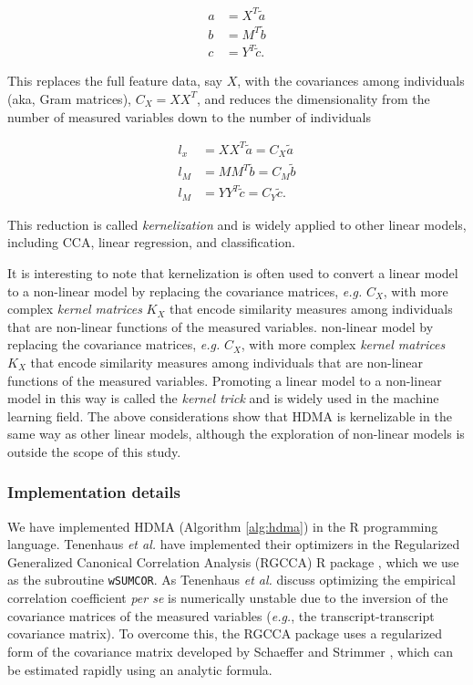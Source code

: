 \documentclass[
]{article}
\begin{document}
\begin{align}
a &= X^T \tilde{a} \\
b &= M^T \tilde{b} \\
c &= Y^T \tilde{c}.
\end{align}

This replaces the full feature data, say \(X\), with the covariances
among individuals (aka, Gram matrices), \(C_X = XX^T\), and reduces the
dimensionality from the number of measured variables down to the number
of individuals

\begin{align}
l_x &= XX^T \tilde{a} = C_X \tilde{a} \\
l_M &= MM^T \tilde{b} = C_M \tilde{b} \\
l_M &= YY^T \tilde{c} = C_Y \tilde{c}.
\end{align}

This reduction is called \textit{kernelization}
\cite{tenenhaus2015kernel} and is widely applied to other linear models,
including CCA, linear regression, and classification.

It is interesting to note that kernelization is often used to convert a
linear model to a non-linear model by replacing the covariance matrices,
\textit{e.g.} \(C_X\), with more complex \textit{kernel matrices}
\(K_X\) that encode similarity measures among individuals that are
non-linear functions of the measured variables. non-linear model by
replacing the covariance matrices, \textit{e.g.} \(C_X\), with more
complex \textit{kernel matrices} \(K_X\) that encode similarity measures
among individuals that are non-linear functions of the measured
variables. Promoting a linear model to a non-linear model in this way is
called the \textit{kernel trick} and is widely used in the machine
learning field. The above considerations show that HDMA is kernelizable
in the same way as other linear models, although the exploration of
non-linear models is outside the scope of this study.

\subsubsection{Implementation details}\label{implementation-details}

We have implemented HDMA (Algorithm \ref{alg:hdma}) in the R programming
language. Tenenhaus \textit{et al.} have implemented their optimizers in
the Regularized Generalized Canonical Correlation Analysis (RGCCA) R
package \cite{girka2023multiblock}, which we use as the subroutine
\texttt{wSUMCOR}. As Tenenhaus \textit{et al.} discuss optimizing the
empirical correlation coefficient \textit{per se} is numerically
unstable due to the inversion of the covariance matrices of the measured
variables (\textit{e.g.}, the transcript-transcript covariance matrix).
To overcome this, the RGCCA package uses a regularized form of the
covariance matrix developed by Schaeffer and Strimmer
\cite{schafer2005shrinkage}, which can be estimated rapidly using an
analytic formula.
\end{document}

